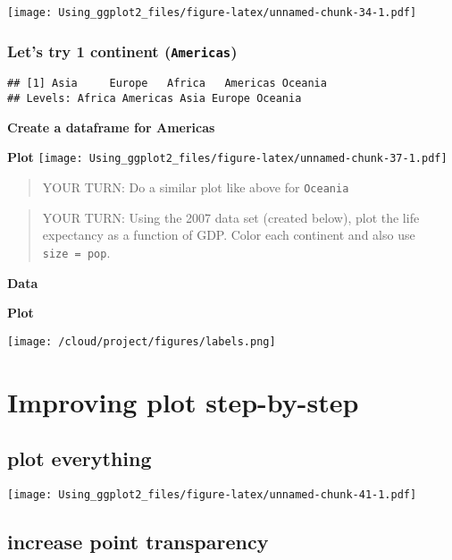 \documentclass[]{article}
\begin{document}
\texttt{[image: Using\_ggplot2\_files/figure-latex/unnamed-chunk-34-1.pdf]}

\hypertarget{lets-try-1-continent-americas}{%
\subsubsection{\texorpdfstring{Let's try 1 continent
(\texttt{Americas})}{Let's try 1 continent (Americas)}}\label{lets-try-1-continent-americas}}

\begin{verbatim}
## [1] Asia     Europe   Africa   Americas Oceania 
## Levels: Africa Americas Asia Europe Oceania
\end{verbatim}

\textbf{Create a dataframe for Americas}

\textbf{Plot}
\texttt{[image: Using\_ggplot2\_files/figure-latex/unnamed-chunk-37-1.pdf]}

\begin{quote}
YOUR TURN: Do a similar plot like above for \texttt{Oceania}
\end{quote}

\begin{quote}
YOUR TURN: Using the 2007 data set (created below), plot the life
expectancy as a function of GDP. Color each continent and also use
\texttt{size\ =\ pop}.
\end{quote}

\textbf{Data}

\textbf{Plot}

\texttt{[image: /cloud/project/figures/labels.png]}

\hypertarget{improving-plot-step-by-step}{%
\section{Improving plot
step-by-step}\label{improving-plot-step-by-step}}

\hypertarget{plot-everything}{%
\subsection{plot everything}\label{plot-everything}}

\texttt{[image: Using\_ggplot2\_files/figure-latex/unnamed-chunk-41-1.pdf]}

\hypertarget{increase-point-transparency}{%
\subsection{increase point
transparency}\label{increase-point-transparency}}
\end{document}
